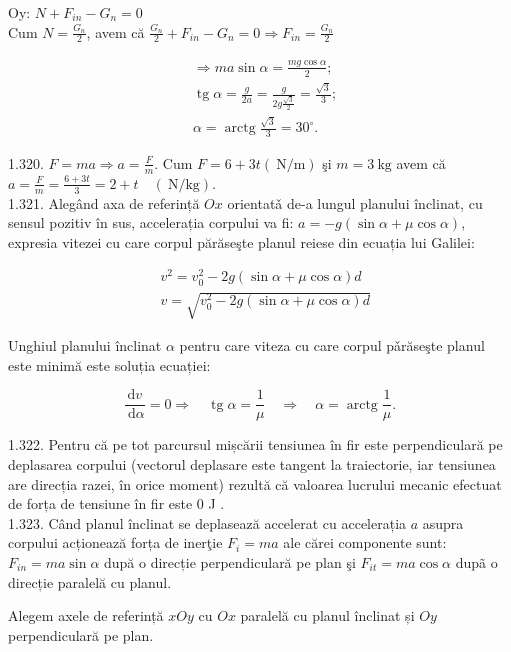 \documentclass[10pt]{article}
\begin{document}
Oy: $N+F_{i n}-G_{n}=0$\\
Cum $N=\frac{G_{n}}{2}$, avem că $\frac{G_{n}}{2}+F_{i n}-G_{n}=0 \Rightarrow F_{i n}=\frac{G_{n}}{2}$

$$
\begin{aligned}
& \Rightarrow m a \sin \alpha=\frac{m g \cos \alpha}{2} ; \\
& \operatorname{tg} \alpha=\frac{g}{2 a}=\frac{g}{2 g \frac{\sqrt{3}}{2}}=\frac{\sqrt{3}}{3} ; \\
& \alpha=\operatorname{arctg} \frac{\sqrt{3}}{3}=30^{\circ} .
\end{aligned}
$$

1.320. $F=m a \Rightarrow a=\frac{F}{m}$. Cum $F=6+3 t(\mathrm{~N} / \mathrm{m})$ şi $m=3 \mathrm{~kg}$ avem că $a=\frac{F}{m}=\frac{6+3 t}{3}=2+t \quad(\mathrm{~N} / \mathrm{kg})$.\\
1.321. Alegând axa de referință $O x$ orientatǎ de-a lungul planului înclinat, cu sensul pozitiv în sus, accelerația corpului va fi: $a=-g(\sin \alpha+\mu \cos \alpha)$, expresia vitezei cu care corpul părăseşte planul reiese din ecuația lui Galilei:

$$
\begin{aligned}
& v^{2}=v_{0}^{2}-2 g(\sin \alpha+\mu \cos \alpha) d \\
& v=\sqrt{v_{0}^{2}-2 g(\sin \alpha+\mu \cos \alpha) d}
\end{aligned}
$$

Unghiul planului înclinat $\alpha$ pentru care viteza cu care corpul pǎrăseşte planul este minimă este soluția ecuației:

$$
\frac{\mathrm{d} v}{\mathrm{~d} \alpha}=0 \Rightarrow \quad \operatorname{tg} \alpha=\frac{1}{\mu} \quad \Rightarrow \quad \alpha=\operatorname{arctg} \frac{1}{\mu} .
$$

1.322. Pentru că pe tot parcursul mișcării tensiunea în fir este perpendiculară pe deplasarea corpului (vectorul deplasare este tangent la traiectorie, iar tensiunea are direcția razei, în orice moment) rezultă că valoarea lucrului mecanic efectuat de forța de tensiune în fir este 0 J .\\
1.323. Când planul înclinat se deplasează accelerat cu accelerația $a$ asupra corpului acționează forța de inerţie $F_{i}=m a$ ale cărei componente sunt: $F_{i n}=m a \sin \alpha$ după o direcție perpendiculară pe plan şi $F_{i t}=m a \cos \alpha$ dupã o direcție paralelă cu planul.

Alegem axele de referință $x O y$ cu $O x$ paralelă cu planul înclinat și $O y$ perpendiculară pe plan.
\end{document}
